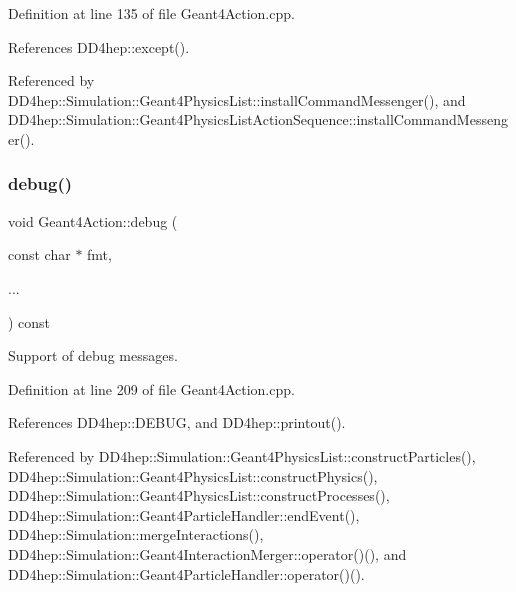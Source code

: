 Definition at line 135 of file Geant4\+Action.\+cpp.



References D\+D4hep\+::except().



Referenced by D\+D4hep\+::\+Simulation\+::\+Geant4\+Physics\+List\+::install\+Command\+Messenger(), and D\+D4hep\+::\+Simulation\+::\+Geant4\+Physics\+List\+Action\+Sequence\+::install\+Command\+Messenger().

\hypertarget{class_d_d4hep_1_1_simulation_1_1_geant4_action_a22a58ac372d240b1a7d0f34f1fc1a67b}{}\label{class_d_d4hep_1_1_simulation_1_1_geant4_action_a22a58ac372d240b1a7d0f34f1fc1a67b} 
\subsubsection{\texorpdfstring{debug()}{debug()}}
{\footnotesize\ttfamily void Geant4\+Action\+::debug (\begin{DoxyParamCaption}\item[{const char $\ast$}]{fmt,  }\item[{}]{... }\end{DoxyParamCaption}) const}



Support of debug messages. 



Definition at line 209 of file Geant4\+Action.\+cpp.



References D\+D4hep\+::\+D\+E\+B\+UG, and D\+D4hep\+::printout().



Referenced by D\+D4hep\+::\+Simulation\+::\+Geant4\+Physics\+List\+::construct\+Particles(), D\+D4hep\+::\+Simulation\+::\+Geant4\+Physics\+List\+::construct\+Physics(), D\+D4hep\+::\+Simulation\+::\+Geant4\+Physics\+List\+::construct\+Processes(), D\+D4hep\+::\+Simulation\+::\+Geant4\+Particle\+Handler\+::end\+Event(), D\+D4hep\+::\+Simulation\+::merge\+Interactions(), D\+D4hep\+::\+Simulation\+::\+Geant4\+Interaction\+Merger\+::operator()(), and D\+D4hep\+::\+Simulation\+::\+Geant4\+Particle\+Handler\+::operator()().

\hypertarget{class_d_d4hep_1_1_simulation_1_1_geant4_action_a51be57d542edbba2b5e4a53a7fea6315}{}\label{class_d_d4hep_1_1_simulation_1_1_geant4_action_a51be57d542edbba2b5e4a53a7fea6315} 
